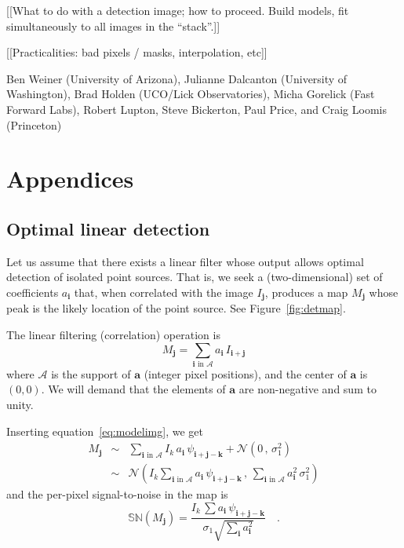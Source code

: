 \documentclass[letterpaper,preprint]{aastex62}
\newcommand{\equationname}{equation}
\newcommand{\eqnref}[1]{\mbox{\equationname~\ref{#1}}}
\newcommand{\figref}[1]{\mbox{Figure~\ref{#1}}}
\newcommand{\drawnfrom}{\sim}
\newcommand{\gaussianN}{\mathcal{N}}
\newcommand{\gaussx}[2]{\gaussianN\!\left(#1 \, , \, #2\right)}
\newcommand{\psf}{\psi}
\newcommand{\psfat}[1]{\psf_{#1}}
\newcommand{\signoise}{[S/N]}
\newcommand{\snr}[1]{\mathbb{SN}(#1)}
\renewcommand{\vec}[1]{\boldsymbol{#1}}
\newcommand{\avec}{\vec{a}}
\newcommand{\ivec}{\vec{i}}
\newcommand{\jvec}{\vec{j}}
\newcommand{\kvec}{\vec{k}}
\newcommand{\coord}[2]{(#1, #2)}
\newcommand{\iina}{\ivec \,\, \mathrm{in} \,\, \mathcal{A}}
\begin{document}
[[What to do with a detection image; how to proceed.  Build models,
    fit simultaneously to all images in the ``stack''.]]

[[Practicalities: bad pixels / masks, interpolation, etc]]

\acknowledgements

Ben Weiner (University of Arizona),
Julianne Dalcanton (University of Washington),
Brad Holden (UCO/Lick Observatories),
Micha Gorelick (Fast Forward Labs),
Robert Lupton, Steve Bickerton, Paul Price, and Craig Loomis (Princeton)


%
%



\appendix

\section{Appendices}

\subsection{Optimal linear detection}
\label{app:lindet}

Let us assume that there exists a linear filter whose output allows
optimal detection of isolated point sources.  That is, we seek a
(two-dimensional) set of coefficients $a_{\ivec}$ that, when
correlated with the image $I_{\jvec}$, produces a map $M_{\jvec}$
whose peak is the likely location of the point source.  See
\figref{fig:detmap}.


The linear filtering (correlation) operation is
\begin{equation}
M_{\jvec} = \sum_{\iina} a_{\ivec} \, I_{\ivec + \jvec}
\label{eq:detmap1}
\end{equation}
where $\mathcal{A}$ is the support of $\avec$ (integer pixel
positions), and the center of $\avec$ is $\coord{0}{0}$.  We will
demand that the elements of $\avec$ are non-negative and sum to unity.

Inserting \eqnref{eq:modelimg}, we get
\begin{eqnarray}
M_{\jvec} &\drawnfrom& \sum_{\iina}
  I_k \, a_{\ivec} \, \psfat{\ivec + \jvec - \kvec} + \gaussx{0}{\sigma_1^2}
  \\
&\drawnfrom& \gaussx{ I_k \sum_{\iina} a_{\ivec} \, \psfat{\ivec + \jvec - \kvec}}%
    {\sum_{\iina} a_{\ivec}^2 \, \sigma_1^2}
\end{eqnarray}
and the per-pixel signal-to-noise in the map is
\begin{equation}
  \snr{M_{\jvec}} = \frac{I_k \, \sum a_{\ivec} \, \psfat{\ivec + \jvec - \kvec}}{\sigma_1 \sqrt{\sum_{\ivec} a_{\ivec}^2}} \quad .
  \label{eq:detmapsn1}
\end{equation}
\end{document}
